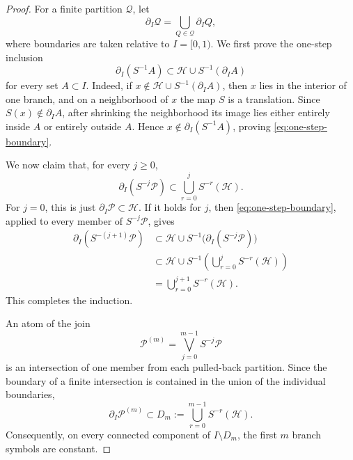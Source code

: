 \documentclass[11pt]{amsart}
\theoremstyle{plain}
\theoremstyle{definition}
\theoremstyle{remark}
\newcommand{\cP}{\mathcal P}
\newcommand{\cH}{\mathcal H}
\begin{document}
\begin{proof}
For a finite partition \(\mathcal Q\), let
\[
        \partial_I\mathcal Q
        =\bigcup_{Q\in\mathcal Q}\partial_I Q,
\]
where boundaries are taken relative to \(I=[0,1)\). We first prove the one-step inclusion
\[
        \partial_I(S^{-1}A)
        \subset
        \cH\cup S^{-1}(\partial_I A)
\tag{3.1}
\label{eq:one-step-boundary}
\]
for every set \(A\subset I\). Indeed, if
\(x\notin\cH\cup S^{-1}(\partial_I A)\), then \(x\) lies in the interior of one branch,
and on a neighborhood of \(x\) the map \(S\) is a translation. Since
\(S(x)\notin\partial_I A\), after shrinking the neighborhood its image lies either entirely
inside \(A\) or entirely outside \(A\). Hence \(x\notin\partial_I(S^{-1}A)\), proving
\eqref{eq:one-step-boundary}.

We now claim that, for every \(j\geq0\),
\[
        \partial_I(S^{-j}\cP)
        \subset
        \bigcup_{r=0}^{j}S^{-r}(\cH).
\tag{3.2}
\label{eq:pullback-boundary-induction}
\]
For \(j=0\), this is just \(\partial_I\cP\subset\cH\). If it holds for \(j\), then
\eqref{eq:one-step-boundary}, applied to every member of \(S^{-j}\cP\), gives
\[
\begin{aligned}
\partial_I(S^{-(j+1)}\cP)
&\subset
\cH\cup S^{-1}\bigl(\partial_I(S^{-j}\cP)\bigr)\\
&\subset
\cH\cup S^{-1}\left(\bigcup_{r=0}^{j}S^{-r}(\cH)\right)\\
&=
\bigcup_{r=0}^{j+1}S^{-r}(\cH).
\end{aligned}
\]
This completes the induction.

An atom of the join
\[
        \cP^{(m)}=\bigvee_{j=0}^{m-1}S^{-j}\cP
\]
is an intersection of one member from each pulled-back partition. Since the boundary of a
finite intersection is contained in the union of the individual boundaries,
\[
        \partial_I\cP^{(m)}
        \subset
        D_m:=\bigcup_{r=0}^{m-1}S^{-r}(\cH).
\tag{3.3}
\label{eq:refinement-boundary}
\]
Consequently, on every connected component of \(I\setminus D_m\), the first \(m\) branch
symbols are constant.


\end{proof}
\end{document}
